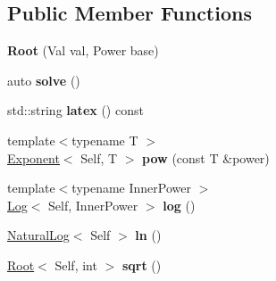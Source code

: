 \subsection*{\-Public \-Member \-Functions}
\begin{DoxyCompactItemize}
\item 
\hypertarget{classlatex_1_1math_1_1Root_a5457dc9b5582666b2bfaf2ea1342ec8a}{{\bfseries \-Root} (\-Val val, \-Power base)}\label{classlatex_1_1math_1_1Root_a5457dc9b5582666b2bfaf2ea1342ec8a}

\item 
\hypertarget{classlatex_1_1math_1_1Root_a97fe8f491bf5c90605d6f6aed7073a3a}{auto {\bfseries solve} ()}\label{classlatex_1_1math_1_1Root_a97fe8f491bf5c90605d6f6aed7073a3a}

\item 
\hypertarget{classlatex_1_1math_1_1Root_a7c2119b0146924a8388cbeaa72c4894d}{std\-::string {\bfseries latex} () const }\label{classlatex_1_1math_1_1Root_a7c2119b0146924a8388cbeaa72c4894d}

\item 
\hypertarget{classlatex_1_1math_1_1Root_a681826f8372d009b0cfd9acc335e19ae}{{\footnotesize template$<$typename T $>$ }\\\hyperlink{classlatex_1_1math_1_1Exponent}{\-Exponent}$<$ \-Self, \-T $>$ {\bfseries pow} (const \-T \&power)}\label{classlatex_1_1math_1_1Root_a681826f8372d009b0cfd9acc335e19ae}

\item 
\hypertarget{classlatex_1_1math_1_1Root_aa278a24731fa57ed7e4d0615998398a0}{{\footnotesize template$<$typename Inner\-Power $>$ }\\\hyperlink{classlatex_1_1math_1_1Log}{\-Log}$<$ \-Self, \-Inner\-Power $>$ {\bfseries log} ()}\label{classlatex_1_1math_1_1Root_aa278a24731fa57ed7e4d0615998398a0}

\item 
\hypertarget{classlatex_1_1math_1_1Root_aff88b4d579979681a8794881aab0646c}{\hyperlink{classlatex_1_1math_1_1NaturalLog}{\-Natural\-Log}$<$ \-Self $>$ {\bfseries ln} ()}\label{classlatex_1_1math_1_1Root_aff88b4d579979681a8794881aab0646c}

\item 
\hypertarget{classlatex_1_1math_1_1Root_ab924cd8aa34a6284bd6b7b44610ec088}{\hyperlink{classlatex_1_1math_1_1Root}{\-Root}$<$ \-Self, int $>$ {\bfseries sqrt} ()}\label{classlatex_1_1math_1_1Root_ab924cd8aa34a6284bd6b7b44610ec088}

\end{DoxyCompactItemize}
